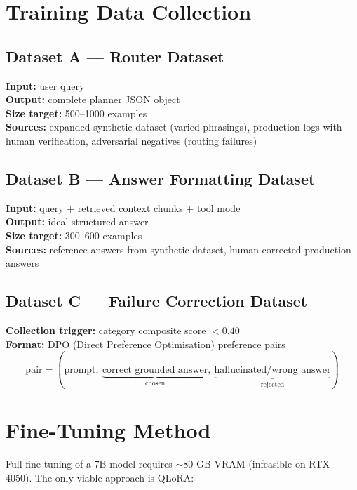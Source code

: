 \documentclass[12pt,a4paper]{report}
\begin{document}
\section{Training Data Collection}

\subsection{Dataset A --- Router Dataset}

\textbf{Input:} user query \\
\textbf{Output:} complete planner JSON object \\
\textbf{Size target:} 500--1000 examples \\
\textbf{Sources:} expanded synthetic dataset (varied phrasings), production logs with human verification, adversarial negatives (routing failures)

\subsection{Dataset B --- Answer Formatting Dataset}

\textbf{Input:} query + retrieved context chunks + tool mode \\
\textbf{Output:} ideal structured answer \\
\textbf{Size target:} 300--600 examples \\
\textbf{Sources:} reference answers from synthetic dataset, human-corrected production answers

\subsection{Dataset C --- Failure Correction Dataset}

\textbf{Collection trigger:} category composite score $< 0.40$ \\
\textbf{Format:} DPO (Direct Preference Optimisation) preference pairs \\
\begin{equation}
  \text{pair} = (\text{prompt},\ \underbrace{\text{correct grounded answer}}_{\text{chosen}},\ \underbrace{\text{hallucinated/wrong answer}}_{\text{rejected}})
\end{equation}

\section{Fine-Tuning Method}

Full fine-tuning of a 7B model requires $\sim$80 GB VRAM (infeasible on RTX 4050). The only viable approach is QLoRA:
\end{document}
